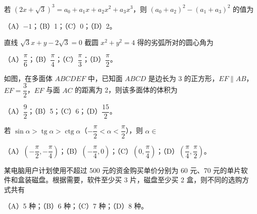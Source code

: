 \begin{question}
若 $(2x+\sqrt3)^3=a_0+a_1x+a_2x^2+a_3x^3$，则 $(a_0+a_2)^2-(a_1+a_3)^2$ 的值为

（A）$-1$；（B）1；（C）0；（D）2。

\end{question}
\begin{question}
直线 $\sqrt3x+y-2\sqrt3=0$ 截圆 $x^2+y^2=4$ 得的劣弧所对的圆心角为

（A）$\dfrac\pi6$；（B）$\dfrac\pi4$；（C）$\dfrac\pi3$；（D）$\dfrac\pi2$。

\Needspace{0.4\textheight}
\end{question}
\begin{question}
如图，在多面体 $ABCDEF$ 中，已知面 $ABCD$ 是边长为 3 的正方形，$EF\parallel AB$，$EF=\dfrac32$，$EF$ 与面 $AC$ 的距离为 2，则该多面体的体积为

（A）$\dfrac92$；（B）5；（C）6；（D）$\dfrac{15}{2}$。
\nopagebreak[4]
\begin{center}\end{center}
\nopagebreak[4]
\end{question}
\begin{question}
若 $\sin\alpha>\operatorname{tg}\alpha>\operatorname{ctg}\alpha$（$-\dfrac\pi2<\alpha<\dfrac\pi2$），则 $\alpha\in$

（A）$\left(-\dfrac\pi2,-\dfrac\pi4\right)$；（B）$\left(-\dfrac\pi4,0\right)$；（C）$\left(0,\dfrac\pi4\right)$；（D）$\left(\dfrac\pi4,\dfrac\pi2\right)$。

\end{question}
\begin{question}
某电脑用户计划使用不超过 500 元的资金购买单价分别为 60 元、70 元的单片软件和盒装磁盘。根据需要，软件至少买 3 片，磁盘至少买 2 盒，则不同的选购方式共有

（A）5 种；（B）6 种；（C）7 种；（D）8 种。

\end{question}


